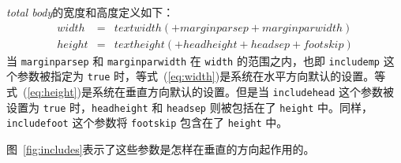\documentclass[titlepage]{ctexart}
\newcommand{\gpart}[1]{\textsf{\textsl{\color[rgb]{.0,.45,.7}#1}}}
\begin{document}
	\gpart{total body}的宽度和高度定义如下：
	\begin{eqnarray}
	\label{eq:width}
	width &=& textwidth (+marginparsep+marginparwidth)\\
	\label{eq:height}
	height &=& textheight (+headheight+headsep+footskip)
	\end{eqnarray}
	当 \verb|marginparsep| 和 \verb|marginparwidth| 在 \verb|width| 的范围之内，也即 \verb|includemp| 这个参数被指定为 \verb|true| 时，等式~(\ref{eq:width})是系统在水平方向默认的设置。等式~(\ref{eq:height})是系统在垂直方向默认的设置。但是当 \verb|includehead| 这个参数被设置为 \verb|true| 时，\verb|headheight| 和 \verb|headsep| 则被包括在了 \verb|height| 中。同样，\verb|includefoot| 这个参数将 \verb|footskip| 包含在了 \verb|height| 中。
	
	图~\ref{fig:includes}表示了这些参数是怎样在垂直的方向起作用的。
\end{document}

